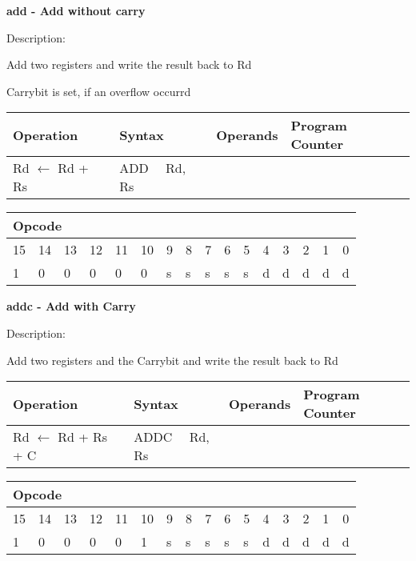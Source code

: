 \documentclass{article}
\begin{document}
\bigskip

\textbf{add - Add without carry}

Description:

Add two registers and write the result back to Rd

Carrybit is set, if an overflow occurrd

\begin{tabular}{|l|l|l|l|}
\hline
Operation & Syntax & Operands & Program Counter \\ \hline
Rd $\leftarrow $ Rd + Rs & ADD \ \ Rd, Rs &  &  \\ \hline
\end{tabular}

\begin{tabular}{|c|c|c|c|c|c|c|c|c|c|c|c|c|c|c|c|}
\hline
\multicolumn{6}{|l|}{Opcode} & \multicolumn{5}{|l|}{} & \multicolumn{5}{|l|}{
} \\ \hline
15 & 14 & 13 & 12 & 11 & 10 & 9 & 8 & 7 & 6 & 5 & 4 & 3 & 2 & 1 & 0 \\ \hline
\multicolumn{1}{|l|}{1} & \multicolumn{1}{|l|}{0} & \multicolumn{1}{|l|}{0}
& \multicolumn{1}{|l|}{0} & \multicolumn{1}{|l|}{0} & \multicolumn{1}{|l|}{0}
& \multicolumn{1}{|l|}{s} & \multicolumn{1}{|l|}{s} & \multicolumn{1}{|l|}{s}
& \multicolumn{1}{|l|}{s} & \multicolumn{1}{|l|}{s} & \multicolumn{1}{|l|}{d}
& \multicolumn{1}{|l|}{d} & \multicolumn{1}{|l|}{d} & \multicolumn{1}{|l|}{d}
& \multicolumn{1}{|l|}{d} \\ \hline
\end{tabular}

\bigskip

\textbf{addc - Add with Carry}

Description:

Add two registers and the Carrybit and write the result back to Rd

\begin{tabular}{|l|l|l|l|}
\hline
Operation & Syntax & Operands & Program Counter \\ \hline
Rd $\leftarrow $ Rd + Rs + C & ADDC \ \ Rd, Rs &  &  \\ \hline
\end{tabular}

\begin{tabular}{|c|c|c|c|c|c|c|c|c|c|c|c|c|c|c|c|}
\hline
\multicolumn{6}{|l|}{Opcode} & \multicolumn{5}{|l|}{} & \multicolumn{5}{|l|}{
} \\ \hline
15 & 14 & 13 & 12 & 11 & 10 & 9 & 8 & 7 & 6 & 5 & 4 & 3 & 2 & 1 & 0 \\ \hline
\multicolumn{1}{|l|}{1} & \multicolumn{1}{|l|}{0} & \multicolumn{1}{|l|}{0}
& \multicolumn{1}{|l|}{0} & \multicolumn{1}{|l|}{0} & \multicolumn{1}{|l|}{1}
& \multicolumn{1}{|l|}{s} & \multicolumn{1}{|l|}{s} & \multicolumn{1}{|l|}{s}
& \multicolumn{1}{|l|}{s} & \multicolumn{1}{|l|}{s} & \multicolumn{1}{|l|}{d}
& \multicolumn{1}{|l|}{d} & \multicolumn{1}{|l|}{d} & \multicolumn{1}{|l|}{d}
& \multicolumn{1}{|l|}{d} \\ \hline
\end{tabular}
\end{document}
